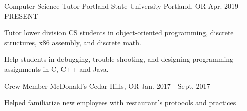 
\begin{cventries}
  \cventry
    {Computer Science Tutor} %
    {Portland State University} %
    {Portland, OR} %
    {Apr. 2019 - PRESENT} %
    {
      \begin{cvitems} %
        \item {Tutor lower division CS students in object-oriented programming, discrete structures, x86 assembly, and discrete math.}
        \item {Help students in debugging, trouble-shooting, and designing programming assignments in C, C++ and Java.}
      \end{cvitems}
    }

  \cventry
    {Crew Member} %
    {McDonald's} %
    {Cedar Hills, OR} %
    {Jan. 2017 - Sept. 2017} %
    {
      \begin{cvitems} %
        \item {Helped familiarize new employees with restaurant’s protocols and practices}
      \end{cvitems}
    }

  
\end{cventries}
